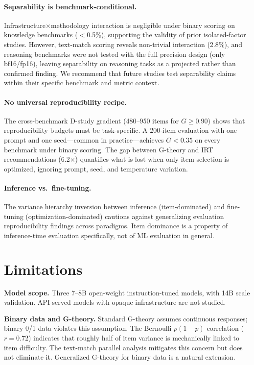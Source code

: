 \documentclass[letterpaper,11pt]{article}
\begin{document}
\paragraph{Separability is benchmark-conditional.}
Infrastructure$\times$methodology interaction is negligible under binary scoring on knowledge benchmarks ($<$0.5\%), supporting the validity of prior isolated-factor studies.
However, text-match scoring reveals non-trivial interaction (2.8\%), and reasoning benchmarks were not tested with the full precision design (only bf16/fp16), leaving separability on reasoning tasks as a projected rather than confirmed finding.
We recommend that future studies test separability claims within their specific benchmark and metric context.

\paragraph{No universal reproducibility recipe.}
The cross-benchmark D-study gradient (480--950 items for $G\geq0.90$) shows that reproducibility budgets must be task-specific.
A 200-item evaluation with one prompt and one seed---common in practice---achieves $G < 0.35$ on every benchmark under binary scoring.
The gap between G-theory and IRT recommendations (6.2$\times$) quantifies what is lost when only item selection is optimized, ignoring prompt, seed, and temperature variation.

\paragraph{Inference vs.\ fine-tuning.}
The variance hierarchy inversion between inference (item-dominated) and fine-tuning (optimization-dominated) cautions against generalizing evaluation reproducibility findings across paradigms.
Item dominance is a property of inference-time evaluation specifically, not of ML evaluation in general.

\section{Limitations}

\textbf{Model scope.}
Three 7--8B open-weight instruction-tuned models, with 14B scale validation.
API-served models with opaque infrastructure are not studied.

\textbf{Binary data and G-theory.}
Standard G-theory assumes continuous responses; binary 0/1 data violates this assumption.
The Bernoulli $p(1-p)$ correlation ($r=0.72$) indicates that roughly half of item variance is mechanically linked to item difficulty.
The text-match parallel analysis mitigates this concern but does not eliminate it.
Generalized G-theory for binary data \citep{brennan2001generalizability} is a natural extension.
\end{document}
